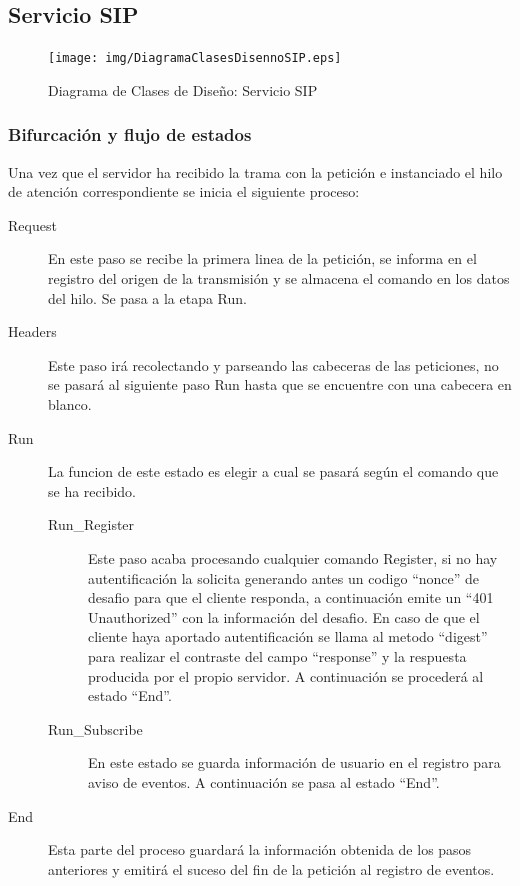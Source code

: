\documentclass[a4paper,spanish,12pt]{book}
\begin{document}
\subsection{Servicio SIP}
\begin{figure}[h]
		\begin{center}
				\texttt{[image: img/DiagramaClasesDisennoSIP.eps]}	
			\end{center}
			\caption{Diagrama de Clases de Diseño: Servicio SIP}
			  \label{fig:DiagramaClasesDisennoSIP}
\end{figure}
\subsubsection{Bifurcación y flujo de estados} 
Una vez que el servidor ha recibido la trama con la petición e instanciado el hilo de atención correspondiente se inicia el siguiente proceso:
\begin{description}
	\item[Request] En este paso se recibe la primera linea de la petición, se informa en el registro del origen de la transmisión y se almacena el comando en los datos del hilo. Se pasa a la etapa Run.
	\item[Headers] Este paso irá recolectando y parseando las cabeceras de las peticiones, no se pasará al siguiente paso Run hasta que se encuentre con una cabecera en blanco.
	\item[Run] La funcion de este estado es elegir a cual se pasará según el comando que se ha recibido.
	\begin{description}
		\item[Run\_Register] Este paso acaba procesando cualquier comando Register, si no hay autentificación la solicita generando antes un codigo ``nonce'' de desafio para que el cliente responda, a continuación emite un ``401 Unauthorized'' con la información del desafio. En caso de que el cliente haya aportado autentificación se llama al metodo ``digest'' para realizar el contraste del campo ``response'' y la respuesta producida por el propio servidor. A continuación se procederá al estado ``End''.
		\item[Run\_Subscribe] En este estado se guarda información de usuario en el registro para aviso de eventos. A continuación se pasa al estado ``End''.
	\end{description}
	\item[End] Esta parte del proceso guardará la información obtenida de los pasos anteriores y emitirá el suceso del fin de la petición al registro de eventos.
\end{description}
\end{document}
